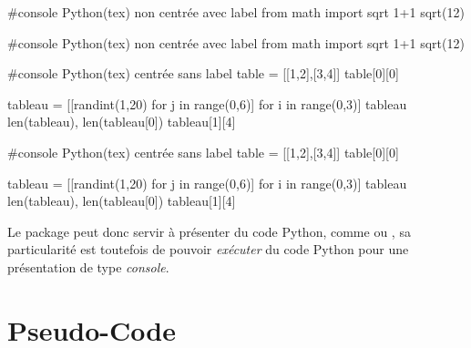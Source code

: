 \documentclass{article}
\newcommand\ctex[1]{\tcbox[vignettelatex]{#1}}
\begin{document}
\begin{codetex}
\begin{envconsolepythontex}[largeur=14cm,centre=false]
	#console Python(tex) non centrée avec label
	from math import sqrt
	1+1
	sqrt(12)
\end{envconsolepythontex}
\end{codetex}

\begin{codesortie}
\smallskip
\begin{envconsolepythontex}[largeur=14cm,centre=false]
	#console Python(tex) non centrée avec label
	from math import sqrt
	1+1
	sqrt(12)
\end{envconsolepythontex}
\end{codesortie}

\begin{codetex}
\begin{envconsolepythontex}[largeur=14cm,label=false]
	#console Python(tex) centrée sans label
	table = [[1,2],[3,4]]
	table[0][0]
	
	tableau = [[randint(1,20) for j in range(0,6)] for i in range(0,3)]
	tableau
	len(tableau), len(tableau[0])
	tableau[1][4]
\end{envconsolepythontex}
\end{codetex}

\begin{codesortie}
\smallskip
\begin{envconsolepythontex}[largeur=14cm,label=false]
	#console Python(tex) centrée sans label
	table = [[1,2],[3,4]]
	table[0][0]
	
	tableau = [[randint(1,20) for j in range(0,6)] for i in range(0,3)]
	tableau
	len(tableau), len(tableau[0])
	tableau[1][4]
\end{envconsolepythontex}
\end{codesortie}

\begin{codeinfo}
Le package \ctex{pythontex} peut donc servir à présenter du code Python, comme \ctex{minted} ou \ctex{piton}, sa particularité est toutefois de pouvoir \textit{exécuter} du code Python pour une présentation de type \textit{console}.
\end{codeinfo}

\newpage

\section{Pseudo-Code}\label{pseudocode}
\end{document}
